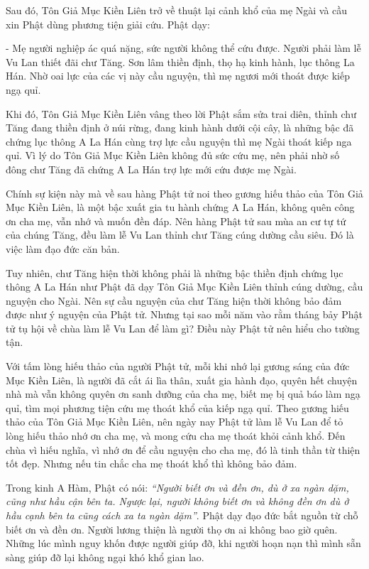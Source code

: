 \documentclass[
  12pt,
  oneside]{book}
\begin{document}
Sau đó, Tôn Giả Mục Kiền Liên trở về thuật lại cảnh khổ của mẹ Ngài và cầu xin Phật dùng phương tiện giải cứu. Phật dạy:

- Mẹ người nghiệp ác quá nặng, sức người không thể cứu được. Người phải làm lễ Vu Lan thiết đãi chư Tăng. Sơn lâm thiền định, thọ hạ kinh hành, lục thông La Hán. Nhờ oai lực của các vị này cầu nguyện, thì mẹ ngươi mới thoát được kiếp ngạ quỉ.

Khi đó, Tôn Giả Mục Kiền Liên vâng theo lời Phật sắm sửa trai diên, thỉnh chư Tăng đang thiền định ở núi rừng, đang kinh hành dưới cội cây, là những bậc đã chứng lục thông A La Hán cùng trợ lực cầu nguyện thì mẹ Ngài thoát kiếp nga quỉ. Vì lý do Tôn Giả Mục Kiền Liên không đủ sức cứu mẹ, nên phải nhờ số đông chư Tăng đã chứng A La Hán trợ lực mới cứu được mẹ Ngài.

Chính sự kiện này mà về sau hàng Phật tử noi theo gương hiếu thảo của Tôn Giả Mục Kiền Liên, là một bậc xuất gia tu hành chứng A La Hán, không quên công ơn cha mẹ, vẫn nhớ và muốn đền đáp. Nên hàng Phật tử sau mùa an cư tự tứ của chúng Tăng, đều làm lễ Vu Lan thỉnh chư Tăng cúng dường cầu siêu. Đó là việc làm đạo đức căn bản.

Tuy nhiên, chư Tăng hiện thời không phải là những bậc thiền định chứng lục thông A La Hán như Phật đã dạy Tôn Giả Mục Kiền Liên thỉnh cúng dường, cầu nguyện cho Ngài. Nên sự cầu nguyện của chư Tăng hiện thời không bảo đảm được như ý nguyện của Phật tử. Nhưng tại sao mỗi năm vào rằm tháng bảy Phật tử tụ hội về chùa làm lễ Vu Lan để làm gì? Điều này Phật tử nên hiểu cho tường tận.

Với tấm lòng hiếu thảo của người Phật tử, mỗi khi nhớ lại gương sáng của đức Mục Kiền Liên, là người đã cắt ái lìa thân, xuất gia hành đạo, quyên hết chuyện nhà mà vẫn không quyên ơn sanh dưỡng của cha mẹ, biết mẹ bị quả báo làm ngạ quỉ, tìm mọi phương tiện cứu mẹ thoát khổ của kiếp ngạ quỉ. Theo gương hiếu thảo của Tôn Giả Mục Kiền Liên, nên ngày nay Phật tử làm lễ Vu Lan để tỏ lòng hiếu thảo nhớ ơn cha mẹ, và mong cứu cha mẹ thoát khỏi cảnh khổ. Đến chùa vì hiếu nghĩa, vì nhớ ơn để cầu nguyện cho cha mẹ, đó là tinh thần từ thiện tốt đẹp. Nhưng nếu tin chắc cha mẹ thoát khổ thì không bảo đảm.

Trong kinh A Hàm, Phật có nói: \emph{``Người biết ơn và đền ơn, dù ở xa ngàn dặm, cũng như hầu cận bên ta. Ngược lại, người không biết ơn và không đền ơn dù ở hầu cạnh bên ta cũng cách xa ta ngàn dặm''}. Phật dạy đạo đức bắt nguồn từ chỗ biết ơn và đền ơn. Người lương thiện là người thọ ơn ai không bao giờ quên. Những lúc mình nguy khốn được người giúp đỡ, khi người hoạn nạn thì mình sẵn sàng giúp đỡ lại không ngại khó khổ gian lao.
\end{document}
